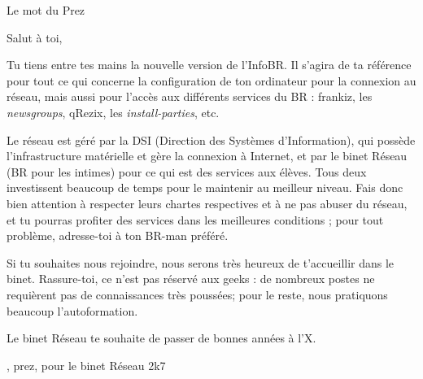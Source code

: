 
\begin{center}
    { \Huge Le mot du Prez }
\end{center}

\indent \indent Salut \`a toi,

Tu tiens entre tes mains la nouvelle version de l'InfoBR. Il s'agira de ta référence pour tout ce qui concerne la configuration de ton ordinateur pour la connexion au réseau, mais aussi pour l'accès aux différents services du BR :
frankiz, les \emph{newsgroups}, qRezix, les \emph{install-parties}, etc.

Le réseau est géré par la DSI (Direction des Systèmes d'Information), qui possède l'infrastructure matérielle et gère la connexion \`a Internet,
et par le binet Réseau (BR pour les intimes) pour ce qui est des services aux élèves. Tous deux investissent beaucoup de temps pour le maintenir au meilleur niveau.
Fais donc bien attention \`a respecter leurs chartes respectives et \`a ne pas abuser du réseau, et tu pourras profiter des services dans les meilleures conditions ; pour tout problème, adresse-toi à ton
BR-man préféré.

Si tu souhaites nous rejoindre, nous serons très heureux de t'accueillir dans le binet. Rassure-toi, ce n'est pas réservé aux geeks : de nombreux postes ne requièrent pas de connaissances très poussées; pour le reste, nous pratiquons beaucoup l'autoformation.

Le binet Réseau te souhaite de passer de bonnes années \`a l'X.\\



\begin{flushright}
    , prez, pour le binet Réseau 2k7 
\end{flushright}


